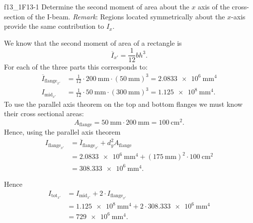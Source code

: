 
\begin{problemwithimage}{f13_1}{F13-1}
  Determine the second moment of area about the $x$ axis of the cross-section of the I-beam.
  \textit{Remark}: Regions located symmetrically about the $x$-axis provide the same contribution to $I_x$.
\end{problemwithimage}

\begin{derivation}
  We know that the second moment of area of a rectangle is
  \begin{equation*}
    \overline{I}_{x'} = \frac{1}{12} bh^3
  .\end{equation*}
  For each of the three parts this corresponds to:
  \begin{align*}
    \overline{I}_{\mathrm{flange}_{x'}} &= \frac{1}{12} \cdot \qty{200}{\mm} \cdot \left( \qty{50}{\mm}  \right)^3  = \qty{2.0833e6}{\mm^4} \\
    I_{\mathrm{mid}_{x'}} &= \frac{1}{12} \cdot \qty{50}{\mm} \cdot \left( \qty{300}{\mm}  \right)^3  = \qty{1.125e8}{\mm^4}
  .\end{align*}
  To use the parallel axis theorem on the top and bottom flanges we must know their cross sectional areas:
  \begin{equation*}
    A_{\mathrm{flange}} = \qty{50}{\mm} \cdot \qty{200}{\mm}  = \qty{100}{\cm^2}
  .\end{equation*}
  Hence, using the parallel axis theorem
  \begin{align*}
    I_{\mathrm{flange}_{x'}} &= \overline{I}_{\mathrm{flange}_{x'}} + d_y^2 A_{\mathrm{flange}} \\
    &= \qty{2.0833e6}{\mm^{4}} + \left( \qty{175}{\mm}  \right)^2 \cdot \qty{100}{\cm^2}  \\
    &= \qty{308,333e6}{\mm^{4}} 
  .\end{align*}
  
  Hence
  \begin{align*}
    I_{\mathrm{tot}_{x'}} &= I_{\mathrm{mid}_{x'}} + 2 \cdot I_{\mathrm{flange}_{x'}} \\
    &= \qty{1.125e8}{\mm^{4}} + 2 \cdot \qty{308,333e6}{\mm^{4}}  \\
    &= \qty{729e6}{\mm^{4}} 
  .\end{align*}
\end{derivation}


